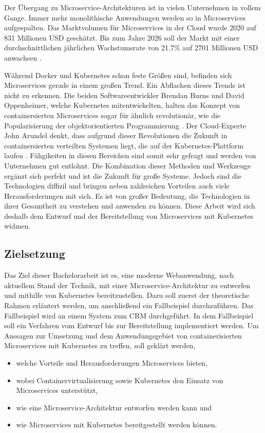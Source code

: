 Der Übergang zu Microservice-Architekturen ist in vielen Unternehmen in vollem Gange. Immer mehr monolithische Anwendungen werden so in Microservices aufgespalten. Das Marktvolumen für Microservices in der Cloud wurde 2020 auf 831 Millionen USD geschätzt. Bis zum Jahre 2026 soll der Markt mit einer durchschnittlichen jährlichen Wachstumsrate von 21.7\% auf 2701 Millionen USD anwachsen \parencite[vgl.][S. 7]{mordorintelligenceGlobal2020}.

Während Docker und Kubernetes schon feste Größen sind, befinden sich Microservices gerade in einem großen Trend. Ein Abflachen dieses Trends ist nicht zu erkennen. Die beiden Softwareentwickler Brendan Burns und David Oppenheimer, welche Kubernetes mitentwickelten, halten das Konzept von containersierten Microservices sogar für ähnlich revolutionär, wie die Popularisierung der objektorientierten Programmierung \parencite[vgl.][S. 1]{burnsDesign2016}. Der Cloud-Experte John Arundel denkt, dass aufgrund dieser Revolutionen die Zukunft in containersierten verteilten Systemen liegt, die auf der Kubernetes-Plattform laufen \parencite[vgl.][S. 1]{arundelCloud2019}. Fähgikeiten in diesen Bereichen sind somit sehr gefragt und werden von Unternehmen gut entlohnt. Die Kombination dieser Methoden und Werkzeuge ergänzt sich perfekt und ist die Zukunft für große Systeme. Jedoch sind die Technologien diffizil und bringen neben zahlreichen Vorteilen auch viele Herausforderungen mit sich. Es ist von großer Bedeutung, die Technologien in ihrer Gesamtheit zu verstehen und anwenden zu können. Diese Arbeit wird sich deshalb dem Entwurf und der Bereitstellung von Microservices mit Kubernetes widmen.
  
\subsection{Zielsetzung}
Das Ziel dieser Bachelorarbeit ist es, eine moderne Webanwendung, nach aktuellem Stand der Technik, mit einer Microservice-Architektur zu entwerfen und mithilfe von Kubernetes bereitzustellen. Dazu soll zuerst der theoretische Rahmen erläutert werden, um anschließend ein Fallbeispiel durchzuführen. Das Fallbeispiel wird an einem System zum  \ac{CRM} durchgeführt. In dem Fallbeispiel soll ein Verfahren vom Entwurf bis zur Bereitstellung implementiert werden. Um Aussagen zur Umsetzung und dem Anwendungsgebiet von containerisierten Microservices mit Kubernetes zu treffen, soll geklärt werden, 

\begin{itemize}
\item welche Vorteile und Herausforderungen Microservices bieten,
\item wobei Containervirtualisierung sowie Kubernetes den Einsatz von Microservices unterstützt,
\item wie eine Microservice-Architektur entworfen werden kann und
\item wie Microservices mit Kubernetes bereitgestellt werden können.
\end{itemize}


